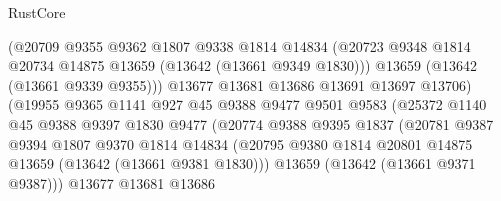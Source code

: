 \begin{lexlean}{RustCore}
\begin{coremodule}
                                (@20709
                                  @9355
                                  @9362
                                  @1807
                                  @9338
                                  @1814
                                  @14834
                                  (@20723
                                    @9348
                                    @1814
                                    @20734
                                    @14875
                                    @13659
                                    (@13642 (@13661 @9349 @1830)))
                                  @13659
                                  (@13642 (@13661 @9339 @9355)))
                                @13677
                                @13681
                                @13686
                                @13691
                                @13697
                                @13706)
                              (@19955
                                @9365
                                @1141
                                @927
                                @45
                                @9388
                                @9477
                                @9501
                                @9583
                                (@25372
                                  @1140
                                  @45
                                  @9388
                                  @9397
                                  @1830
                                  @9477
                                  (@20774
                                    @9388
                                    @9395
                                    @1837
                                    (@20781
                                      @9387
                                      @9394
                                      @1807
                                      @9370
                                      @1814
                                      @14834
                                      (@20795
                                        @9380
                                        @1814
                                        @20801
                                        @14875
                                        @13659
                                        (@13642 (@13661 @9381 @1830)))
                                      @13659
                                      (@13642 (@13661 @9371 @9387)))
                                    @13677
                                    @13681
                                    @13686

\end{coremodule}
\end{lexlean}
